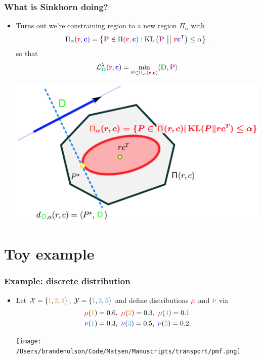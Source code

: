 \documentclass[mathserif,compress,xcolor={dvipsnames}]{beamer}
\newcommand*\ba{\[ \begin{aligned}}
\newcommand*\ea{\end{aligned} \]}
\renewcommand\;{\,}
\begin{document}
\begin{frame}\frametitle{What is Sinkhorn doing?}
\begin{itemize}
\item
Turns out we're constraining region to a new region $\Pi_\alpha$ with
\begin{align}
\Pi_\alpha({\color{red} \mathbf r} , {\color{blue} \mathbf c})
	= \left\{ {\color{Purple} \mathbf P} \in \Pi({\color{red} \mathbf r} , {\color{blue} \mathbf c}) : 
		\text{KL}\left({\color{Purple} \mathbf P} \ \big{|}\big| \ {\color{red} \mathbf r} {\color{blue} \mathbf c}^{\mathsf T} \right) \le \alpha \right\}.
\end{align}
so that
\ba
\mathcal L_{{\color{Green} \mathbf D}}^\lambda(
		{\color{red} \mathbf r}, {\color{blue} \mathbf c})
	= \min_{{\color{Purple} \mathbf P} \in \Pi_\alpha({\color{red} \mathbf r} , {\color{blue} \mathbf c})} 
		\langle \mathbf {\color{Green} D}, {\color{Purple} \mathbf P} \rangle 
\ea
\begin{center}
\includegraphics[width=0.7\linewidth]{Figures/Polytope.png}
\end{center}

\end{itemize}

\end{frame}

\section{Toy example}

\begin{frame}\frametitle{Example: discrete distribution}
\begin{itemize}
\item[]
Let $\mathcal X = \{{\color{orange} 1}, {\color{orange} 2}, {\color{orange} 4}\}$, 
$\mathcal Y = \{ {\color{ProcessBlue} 1}, {\color{ProcessBlue} 3}, {\color{ProcessBlue} 5}\}$ and define distributions $\color{red}\mu$ and $\color{blue}\nu$ via
\ba
{\color{red} \mu} ({\color{orange} 1}) & = 0.6, 
\ {\color{red} \mu} ({\color{orange} 2}) = 0.3, 
\ {\color{red} \mu} ({\color{orange} 4}) = 0.1 \\
{\color{blue} \nu} ({\color{ProcessBlue} 1}) & = 0.3, 
\ {\color{blue} \nu}({\color{ProcessBlue} 3}) = 0.5, 
\ {\color{blue} \nu}({\color{ProcessBlue} 5}) = 0.2.
\ea
\vspace{-2em}
\begin{center}
\texttt{[image: /Users/brandenolson/Code/Matsen/Manuscripts/transport/pmf.png]}
\end{center}
\end{itemize}
\end{frame}
\end{document}

